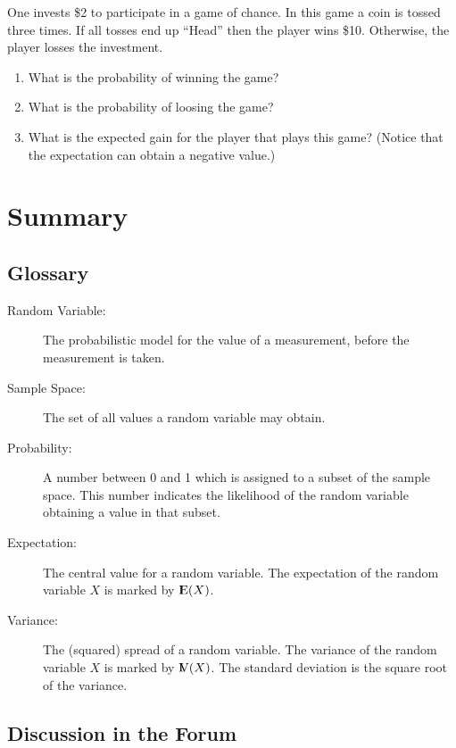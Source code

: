 \documentclass[]{krantz}
\newcommand{\Expec}{{\rm I\kern-.3em E}}
\newcommand{\Var}{{\rm I\kern-.3em V}}
\theoremstyle{definition}
\theoremstyle{definition}
\theoremstyle{definition}
\theoremstyle{remark}
\let\BeginKnitrBlock\begin \let\EndKnitrBlock\end
\begin{document}
\BeginKnitrBlock{exercise}
\protect\hypertarget{exr:unnamed-chunk-51}{}{\label{exr:unnamed-chunk-51} }One invests \$2 to participate in a game of chance.
In this game a coin is tossed three times. If all tosses end up ``Head''
then the player wins \$10. Otherwise, the player losses the investment.

\begin{enumerate}
\def\labelenumi{\arabic{enumi}.}
\item
  What is the probability of winning the game?
\item
  What is the probability of loosing the game?
\item
  What is the expected gain for the player that plays this game?
  (Notice that the expectation can obtain a negative value.)
\end{enumerate}
\EndKnitrBlock{exercise}

\hypertarget{summary-3}{%
\section{Summary}\label{summary-3}}

\hypertarget{glossary}{%
\subsection*{Glossary}\label{glossary}}


\begin{description}
\item[Random Variable:]
The probabilistic model for the value of a measurement, before the
measurement is taken.
\item[Sample Space:]
The set of all values a random variable may obtain.
\item[Probability:]
A number between 0 and 1 which is assigned to a subset of the sample
space. This number indicates the likelihood of the random variable
obtaining a value in that subset.
\item[Expectation:]
The central value for a random variable. The expectation of the
random variable \(X\) is marked by \(\Expec(X)\).
\item[Variance:]
The (squared) spread of a random variable. The variance of the
random variable \(X\) is marked by \(\Var(X)\). The standard deviation
is the square root of the variance.
\end{description}

\hypertarget{discussion-in-the-forum}{%
\subsection*{Discussion in the Forum}\label{discussion-in-the-forum}}
\end{document}

